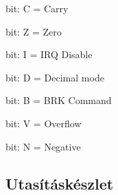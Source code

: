 \begin{compactenum}
	\setcounter{enumi}{-1}
	\item bit: C = Carry
	\item bit: Z = Zero
	\item bit: I = IRQ Disable
	\item bit: D = Decimal mode
	\item bit: B = BRK Command
	\setcounter{enumi}{5}
	\item bit: V = Overflow
	\item bit: N = Negative
\end{compactenum}

\subsection{Utasításkészlet}

